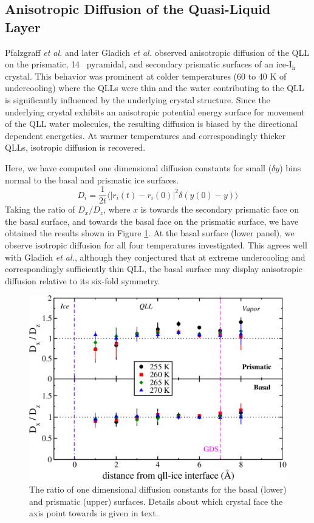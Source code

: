 \subsection{Anisotropic Diffusion of the Quasi-Liquid Layer}
Pfalzgraff \textit{et al.}\cite{Pfalzgraff2011} and later Gladich
\textit{et al.}\cite{Gladich2011,Gladich2015} observed anisotropic
diffusion of the QLL on the prismatic, 14\degree~ pyramidal, and
secondary prismatic surfaces of an ice-I$_\mathrm{h}$ crystal. This
behavior was prominent at colder temperatures (60 to 40 K of
undercooling) where the QLLs were thin and the water contributing to
the QLL is significantly influenced by the underlying crystal
structure. Since the underlying crystal exhibits an anisotropic
potential energy surface for movement of the QLL water molecules, the
resulting diffusion is biased by the directional dependent
energetics. At warmer temperatures and correspondingly thicker QLLs,
isotropic diffusion is recovered.

Here, we have computed one dimensional diffusion constants for small
($\delta y$) bins normal to the basal and prismatic ice surfaces.
\begin{equation}\label{eq:1dDiff}
D_i = \frac{1}{2t} \langle | {r}_i(t) - {r}_i(0) |^2
\delta(y(0) - y)  \rangle 
\end{equation}
Taking the ratio of $D_x / D_z$, where $x$ is towards the secondary
prismatic face on the basal surface, and towards the basal face on the
prismatic surface, we have obtained the results shown in Figure
\ref{fig:dxdz}. At the basal surface (lower panel), we observe
isotropic diffusion for all four temperatures investigated. This
agrees well with Gladich \textit{et al.},\cite{Gladich2011} although
they conjectured that at extreme undercooling and correspondingly
sufficiently thin QLL, the basal surface may display anisotropic
diffusion relative to its six-fold symmetry.

\begin{figure}
\includegraphics[width=\linewidth]{Figures/rd}
\caption{\label{fig:dxdz}The ratio of one dimensional diffusion
  constants for the basal (lower) and prismatic (upper)
  surfaces. Details about which crystal face the axis point towards is
  given in text.}
\end{figure} 

